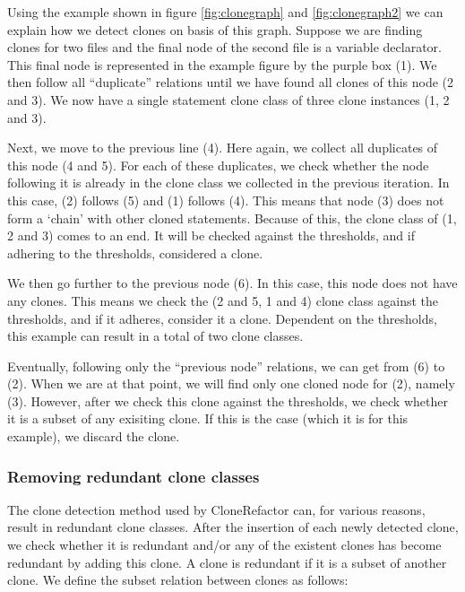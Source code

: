 Using the example shown in figure \ref{fig:clonegraph} and \ref{fig:clonegraph2} we can explain how we detect clones on basis of this graph. Suppose we are finding clones for two files and the final node of the second file is a variable declarator. This final node is represented in the example figure by the purple box (1). We then follow all ``duplicate'' relations until we have found all clones of this node (2 and 3). We now have a single statement clone class of three clone instances (1, 2 and 3).

Next, we move to the previous line (4). Here again, we collect all duplicates of this node (4 and 5). For each of these duplicates, we check whether the node following it is already in the clone class we collected in the previous iteration. In this case, (2) follows (5) and (1) follows (4). This means that node (3) does not form a `chain' with other cloned statements. Because of this, the clone class of (1, 2 and 3) comes to an end. It will be checked against the thresholds, and if adhering to the thresholds, considered a clone.

We then go further to the previous node (6). In this case, this node does not have any clones. This means we check the (2 and 5, 1 and 4) clone class against the thresholds, and if it adheres, consider it a clone. Dependent on the thresholds, this example can result in a total of two clone classes.

Eventually, following only the ``previous node'' relations, we can get from (6) to (2). When we are at that point, we will find only one cloned node for (2), namely (3). However, after we check this clone against the thresholds, we check whether it is a subset of any exisiting clone. If this is the case (which it is for this example), we discard the clone.

\subsubsection{Removing redundant clone classes}\label{sec:conceptualremovingredundant}
The clone detection method used by CloneRefactor can, for various reasons,%
result in redundant clone classes. After the insertion of each newly detected clone, we check whether it is redundant and/or any of the existent clones has become redundant by adding this clone. A clone is redundant if it is a subset of another clone. We define the subset relation between clones as follows:

